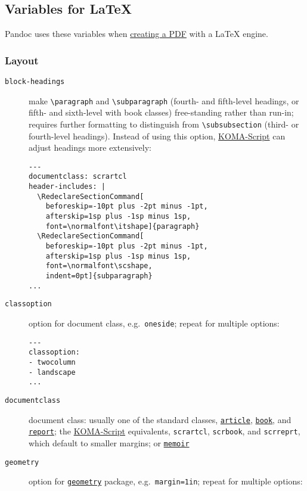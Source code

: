 \documentclass[
  12pt,
  a4paper,
]{article}
\begin{document}
\hypertarget{variables-for-latex}{%
\subsection{Variables for LaTeX}\label{variables-for-latex}}

Pandoc uses these variables when \protect\hyperlink{creating-a-pdf}{creating a PDF} with a LaTeX
engine.

\hypertarget{layout}{%
\subsubsection{Layout}\label{layout}}

\begin{description}
\item[\texttt{block-headings}]
make \texttt{\textbackslash{}paragraph} and \texttt{\textbackslash{}subparagraph} (fourth- and
fifth-level headings, or fifth- and sixth-level with book classes) free-standing rather than
run-in; requires further formatting to distinguish from \texttt{\textbackslash{}subsubsection}
(third- or fourth-level headings). Instead of using this option,
\href{https://ctan.org/pkg/koma-script}{KOMA-Script} can adjust headings more extensively:

\begin{verbatim}
---
documentclass: scrartcl
header-includes: |
  \RedeclareSectionCommand[
    beforeskip=-10pt plus -2pt minus -1pt,
    afterskip=1sp plus -1sp minus 1sp,
    font=\normalfont\itshape]{paragraph}
  \RedeclareSectionCommand[
    beforeskip=-10pt plus -2pt minus -1pt,
    afterskip=1sp plus -1sp minus 1sp,
    font=\normalfont\scshape,
    indent=0pt]{subparagraph}
...
\end{verbatim}
\item[\texttt{classoption}]
option for document class, e.g.~\texttt{oneside}; repeat for multiple options:

\begin{verbatim}
---
classoption:
- twocolumn
- landscape
...
\end{verbatim}
\item[\texttt{documentclass}]
document class: usually one of the standard classes,
\href{https://ctan.org/pkg/article}{\texttt{article}},
\href{https://ctan.org/pkg/book}{\texttt{book}}, and
\href{https://ctan.org/pkg/report}{\texttt{report}}; the
\href{https://ctan.org/pkg/koma-script}{KOMA-Script} equivalents, \texttt{scrartcl},
\texttt{scrbook}, and \texttt{scrreprt}, which default to smaller margins; or
\href{https://ctan.org/pkg/memoir}{\texttt{memoir}}
\item[\texttt{geometry}]
option for \href{https://ctan.org/pkg/geometry}{\texttt{geometry}} package,
e.g.~\texttt{margin=1in}; repeat for multiple options:


\end{description}
\end{document}
